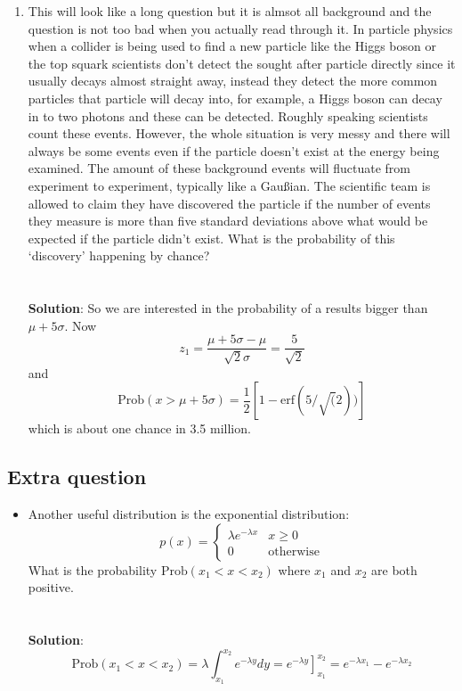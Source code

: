 \documentclass[11pt,a4paper]{scrartcl}
\begin{document}
\begin{enumerate}
\item This will look like a long question but it is almsot all
  background and the question is not too bad when you actually read
  through it. In particle physics when a collider is being used to
  find a new particle like the Higgs boson or the top squark
  scientists don't detect the sought after particle directly since it
  usually decays almost straight away, instead they detect the more
  common particles that particle will decay into, for example, a Higgs
  boson can decay in to two photons and these can be detected. Roughly
  speaking scientists count these events. However, the whole situation
  is very messy and there will always be some events even if the
  particle doesn't exist at the energy being examined. The amount of
  these background events will fluctuate from experiment to
  experiment, typically like a Gau\ss{}ian. The scientific team is
  allowed to claim they have discovered the particle if the number of
  events they measure is more than five standard deviations above
  what would be expected if the particle didn't exist. What is the
  probability of this \lq{}discovery\rq{} happening by chance?
  \\ \\ \\ \textbf{Solution}: So we are interested in the probability of a results bigger than $\mu+5\sigma$. Now
\begin{equation}
z_1=\frac{\mu+5\sigma-\mu}{\sqrt{2}\sigma}=\frac{5}{\sqrt{2}}
\end{equation}
and
\begin{equation}
\mbox{Prob}(x>\mu+5\sigma)=\frac{1}{2}[1-\mbox{erf}(5/\sqrt(2))]
\end{equation}
which is about one chance in 3.5 million.

\end{enumerate}

\subsection*{Extra question}

\begin{itemize}
\item Another useful distribution is the exponential distribution:
$$
p(x)=\left\{\begin{array}{cc}\lambda e^{-\lambda x}& x\ge 0\\ 0&\mbox{otherwise}\end{array}\right.
$$
What is the probability $\mbox{Prob}(x_1 < x <x_2)$ where $x_1$ and $x_2$ are both positive.
  \\ \\ \\ \textbf{Solution}: 
\begin{equation}
\mbox{Prob}(x_1 < x <x_2)=\lambda \int_{x_1}^{x_2} e^{-\lambda y}dy=\left. e^{-\lambda y} \right]_{x_1}^{x_2}=e^{-\lambda x_1}-e^{-\lambda x_2}
\end{equation}
\end{itemize}
\end{document}
